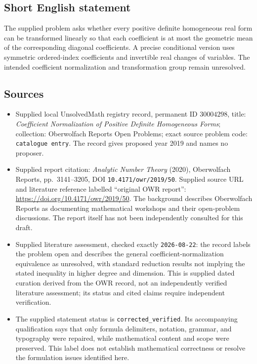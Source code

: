 \documentclass[11pt]{article}
\begin{document}
\subsection{Short English statement}
The supplied problem asks whether every positive definite homogeneous real form can be transformed linearly so that each coefficient is at most the geometric mean of the corresponding diagonal coefficients. A precise conditional version uses symmetric ordered-index coefficients and invertible real changes of variables. The intended coefficient normalization and transformation group remain unresolved.
\subsection{Sources}
\begin{itemize}
\item Supplied local UnsolvedMath registry record, permanent ID \(30004298\), title: \emph{Coefficient Normalization of Positive Definite Homogeneous Forms}; collection: Oberwolfach Reports Open Problems; exact source problem code: \texttt{catalogue entry}. The record gives proposed year 2019 and names no proposer.
\item Supplied report citation: \emph{Analytic Number Theory} (2020), Oberwolfach Reports, pp.~3141--3205, DOI \texttt{10.4171/owr/2019/50}. Supplied source URL and literature reference labelled ``original OWR report'': \url{https://doi.org/10.4171/owr/2019/50}. The background describes Oberwolfach Reports as documenting mathematical workshops and their open-problem discussions. The report itself has not been independently consulted for this draft.
\item Supplied literature assessment, checked exactly \texttt{2026-08-22}: the record labels the problem open and describes the general coefficient-normalization equivalence as unresolved, with standard reduction results not implying the stated inequality in higher degree and dimension. This is supplied dated curation derived from the OWR record, not an independently verified literature assessment; its status and cited claims require independent verification.
\item The supplied statement status is \texttt{corrected\_verified}. Its accompanying qualification says that only formula delimiters, notation, grammar, and typography were repaired, while mathematical content and scope were preserved. This label does not establish mathematical correctness or resolve the formulation issues identified here.
\end{itemize}
\end{document}
